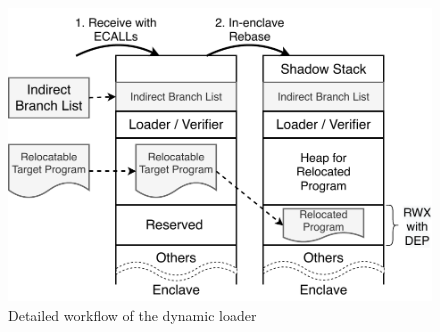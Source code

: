 \begin{figure}[htbp]
\centerline{\includegraphics[scale=0.45]{figures/fg-dynloader.pdf}}
\caption{Detailed workflow of the dynamic loader}\label{fg-dynloader}
\vspace{-10pt}
\end{figure}